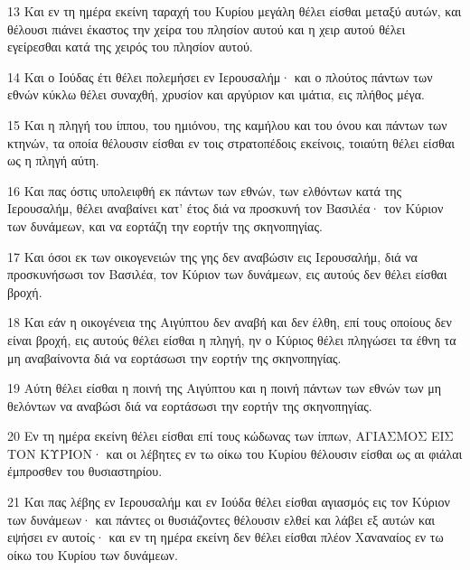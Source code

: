 \par 13 Και εν τη ημέρα εκείνη ταραχή του Κυρίου μεγάλη θέλει είσθαι μεταξύ αυτών, και θέλουσι πιάνει έκαστος την χείρα του πλησίον αυτού και η χειρ αυτού θέλει εγείρεσθαι κατά της χειρός του πλησίον αυτού.
\par 14 Και ο Ιούδας έτι θέλει πολεμήσει εν Ιερουσαλήμ· και ο πλούτος πάντων των εθνών κύκλω θέλει συναχθή, χρυσίον και αργύριον και ιμάτια, εις πλήθος μέγα.
\par 15 Και η πληγή του ίππου, του ημιόνου, της καμήλου και του όνου και πάντων των κτηνών, τα οποία θέλουσιν είσθαι εν τοις στρατοπέδοις εκείνοις, τοιαύτη θέλει είσθαι ως η πληγή αύτη.
\par 16 Και πας όστις υπολειφθή εκ πάντων των εθνών, των ελθόντων κατά της Ιερουσαλήμ, θέλει αναβαίνει κατ' έτος διά να προσκυνή τον Βασιλέα· τον Κύριον των δυνάμεων, και να εορτάζη την εορτήν της σκηνοπηγίας.
\par 17 Και όσοι εκ των οικογενειών της γης δεν αναβώσιν εις Ιερουσαλήμ, διά να προσκυνήσωσι τον Βασιλέα, τον Κύριον των δυνάμεων, εις αυτούς δεν θέλει είσθαι βροχή.
\par 18 Και εάν η οικογένεια της Αιγύπτου δεν αναβή και δεν έλθη, επί τους οποίους δεν είναι βροχή, εις αυτούς θέλει είσθαι η πληγή, ην ο Κύριος θέλει πληγώσει τα έθνη τα μη αναβαίνοντα διά να εορτάσωσι την εορτήν της σκηνοπηγίας.
\par 19 Αύτη θέλει είσθαι η ποινή της Αιγύπτου και η ποινή πάντων των εθνών των μη θελόντων να αναβώσι διά να εορτάσωσι την εορτήν της σκηνοπηγίας.
\par 20 Εν τη ημέρα εκείνη θέλει είσθαι επί τους κώδωνας των ίππων, ΑΓΙΑΣΜΟΣ ΕΙΣ ΤΟΝ ΚΥΡΙΟΝ· και οι λέβητες εν τω οίκω του Κυρίου θέλουσιν είσθαι ως αι φιάλαι έμπροσθεν του θυσιαστηρίου.
\par 21 Και πας λέβης εν Ιερουσαλήμ και εν Ιούδα θέλει είσθαι αγιασμός εις τον Κύριον των δυνάμεων· και πάντες οι θυσιάζοντες θέλουσιν ελθεί και λάβει εξ αυτών και εψήσει εν αυτοίς· και εν τη ημέρα εκείνη δεν θέλει είσθαι πλέον Χαναναίος εν τω οίκω του Κυρίου των δυνάμεων.



